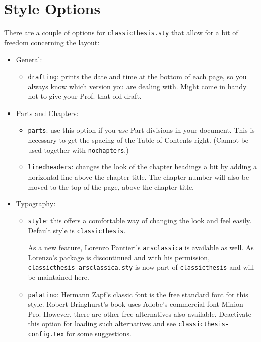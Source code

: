 \clearpage
\section{Style Options}\label{sec:options}
There are a couple of options for \texttt{classicthesis.sty} that
allow for a bit of freedom concerning the layout:
\begin{itemize}
    \item General:
        \begin{itemize}
            \item\texttt{drafting}: prints the date and time at the bottom of
            each page, so you always know which version you are dealing with.
            Might come in handy not to give your Prof. that old draft.
        \end{itemize}

    \item Parts and Chapters:
        \begin{itemize}
            \item\texttt{parts}: use this option if you \emph{use} Part
             divisions in your document. This is necessary to get the
             spacing of the Table of Contents right.
            (Cannot be used together with \texttt{nochapters}.)

            \item\texttt{linedheaders}: changes the look of the chapter
            headings a bit by adding a horizontal line above the chapter
            title. The chapter number will also be moved to the top of the
            page, above the chapter title.
        \end{itemize}

    \item Typography:
        \begin{itemize}
            \item\texttt{style}: this offers a comfortable way of changing the look and feel easily. Default style is \texttt{classicthesis}.

            As a new feature, Lorenzo Pantieri's \texttt{arsclassica} is available as well. As Lorenzo's package is discontinued and with his permission, \texttt{classicthesis-arsclassica.sty} is now part of \texttt{classicthesis} and will be maintained here.

            \item\texttt{palatino}: Hermann Zapf's classic font is the free standard font for this style. Robert Bringhurst's book uses Adobe's commercial font Minion Pro. However, there are other free alternatives also available. Deactivate this option for loading such alternatives and see \texttt{classicthesis-config.tex} for some suggestions.


\end{itemize}
\end{itemize}
